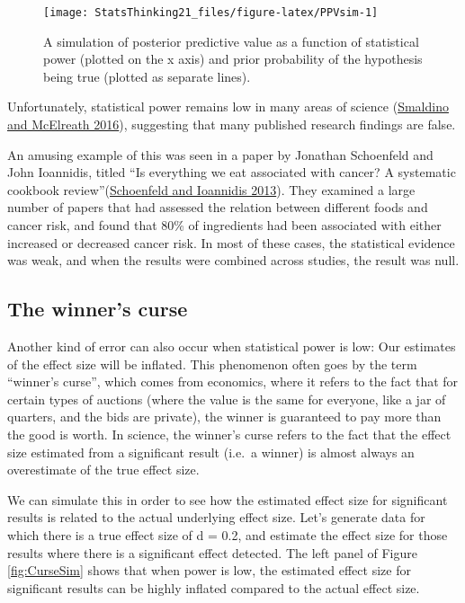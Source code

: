 \documentclass[
  12pt,
]{book}
\begin{document}
\begin{figure}
\texttt{[image: StatsThinking21\_files/figure-latex/PPVsim-1]} \caption{A simulation of posterior predictive value as a function of statistical power (plotted on the x axis) and prior probability of the hypothesis being true (plotted as separate lines).}\label{fig:PPVsim}
\end{figure}

Unfortunately, statistical power remains low in many areas of science (\protect\hyperlink{ref-smal:mcel:2016}{Smaldino and McElreath 2016}), suggesting that many published research findings are false.

An amusing example of this was seen in a paper by Jonathan Schoenfeld and John Ioannidis, titled ``Is everything we eat associated with cancer? A systematic cookbook review''(\protect\hyperlink{ref-scho:ioan:2013}{Schoenfeld and Ioannidis 2013}). They examined a large number of papers that had assessed the relation between different foods and cancer risk, and found that 80\% of ingredients had been associated with either increased or decreased cancer risk. In most of these cases, the statistical evidence was weak, and when the results were combined across studies, the result was null.

\hypertarget{the-winners-curse}{%
\subsection{The winner's curse}\label{the-winners-curse}}

Another kind of error can also occur when statistical power is low: Our estimates of the effect size will be inflated. This phenomenon often goes by the term ``winner's curse'', which comes from economics, where it refers to the fact that for certain types of auctions (where the value is the same for everyone, like a jar of quarters, and the bids are private), the winner is guaranteed to pay more than the good is worth. In science, the winner's curse refers to the fact that the effect size estimated from a significant result (i.e.~a winner) is almost always an overestimate of the true effect size.

We can simulate this in order to see how the estimated effect size for significant results is related to the actual underlying effect size. Let's generate data for which there is a true effect size of d = 0.2, and estimate the effect size for those results where there is a significant effect detected. The left panel of Figure \ref{fig:CurseSim} shows that when power is low, the estimated effect size for significant results can be highly inflated compared to the actual effect size.
\end{document}

